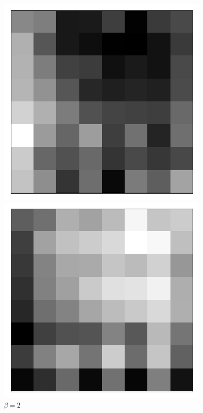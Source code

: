 \begin{figure}[h!]
\centering
\captionsetup{justification=centering}
\begin{multicols}{3}
    \includegraphics[scale=0.4]{figures/results/latent_image/beta_1_average_activation.png}
    \caption{$\beta=1$}
    \includegraphics[scale=0.4]{figures/results/latent_image/beta_2_average_activation.png}
    \caption{$\beta=2$}

\end{multicols}
\end{figure}
